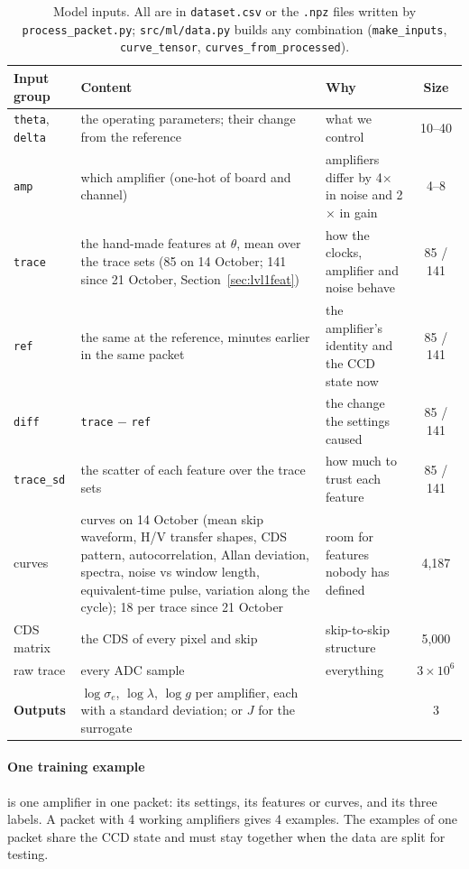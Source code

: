 \documentclass[10pt]{article}
\newcommand{\code}[1]{\texttt{#1}}
\begin{document}
\begin{table}[H]
\centering
\small
\begin{tabularx}{\textwidth}{>{\raggedright\arraybackslash}p{2.6cm}>{\raggedright\arraybackslash}p{4.6cm}Xc}
\toprule
Input group & Content & Why & Size \\
\midrule
\code{theta}, \code{delta} & the operating parameters; their change from the reference & what we control & 10--40 \\
\code{amp} & which amplifier (one-hot of board and channel) & amplifiers differ by 4$\times$ in noise and 2$\times$ in gain & 4--8 \\
\code{trace} & the hand-made features at $\theta$, mean over the trace sets (85 on 14 October; 141 since 21 October, Section~\ref{sec:lvl1feat}) & how the clocks, amplifier and noise behave & 85 / 141 \\
\code{ref} & the same at the reference, minutes earlier in the same packet & the amplifier's identity and the CCD state now & 85 / 141 \\
\code{diff} & \code{trace} $-$ \code{ref} & the change the settings caused & 85 / 141 \\
\code{trace\_sd} & the scatter of each feature over the trace sets & how much to trust each feature & 85 / 141 \\
curves & 12 curves on 14 October (mean skip waveform, H/V transfer shapes, CDS pattern, autocorrelation, Allan deviation, spectra, noise vs window length, equivalent-time pulse, variation along the cycle); 18 per trace since 21 October & room for features nobody has defined & 4{,}187 \\
CDS matrix & the CDS of every pixel and skip & skip-to-skip structure & 5{,}000 \\
raw trace & every ADC sample & everything & $3\times10^6$ \\
\midrule
\textbf{Outputs} & $\log\sigma_e$, $\log\lambda$, $\log g$ per amplifier, each with a standard deviation; or $J$ for the surrogate & & 3 \\
\bottomrule
\end{tabularx}
\caption{Model inputs. All are in \code{dataset.csv} or the \code{.npz} files written by \code{process\_packet.py}; \code{src/ml/data.py}
builds any combination (\code{make\_inputs}, \code{curve\_tensor}, \code{curves\_from\_processed}).}
\label{tab:inputs}
\end{table}

\paragraph{One training example} is one amplifier in one packet: its settings, its features or curves, and its three labels.
A packet with 4 working amplifiers gives 4 examples. The examples of one packet share the CCD state and must stay together
when the data are split for testing.
\end{document}
